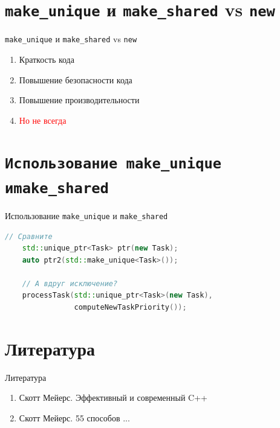\documentclass[10pt]{beamer}
\begin{document}
\section{\texttt{make\_unique} и \texttt{make\_shared} vs \texttt{new}}
\begin{frame}[fragile]{\texttt{make\_unique} и \texttt{make\_shared} vs \texttt{new}}
\begin{enumerate}
    \item Краткость кода
    \item Повышение безопасности кода
    \item Повышение производительности
    \pause
    \item \textcolor{red}{Но не всегда}
\end{enumerate}
\end{frame}

\section{\texttt{Использование \texttt{make\_unique} и\texttt{make\_shared}}}
\begin{frame}[fragile]{Использование \texttt{make\_unique} и \texttt{make\_shared}}
\begin{lstlisting}[language=C++]
    // Сравните
    std::unique_ptr<Task> ptr(new Task);
    auto ptr2(std::make_unique<Task>());

    // А вдруг исключение?
    processTask(std::unique_ptr<Task>(new Task), 
                computeNewTaskPriority());
\end{lstlisting}
\end{frame}

\section{Литература}
\begin{frame}[fragile]{Литература}
\begin{enumerate}
    \item Скотт Мейерс. Эффективный и современный C++
    \item Скотт Мейерс. 55 способов ... 
\end{enumerate}
\end{frame}
\end{document}

